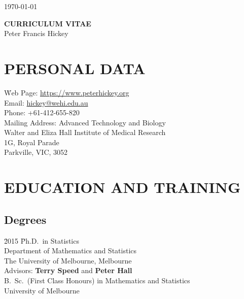 \documentclass[11pt,letterpaper,pdf]{article}
\begin{document}
\hfill \today

\begin{center}
{\bf \Large CURRICULUM VITAE}\\
\vspace*{5mm}
{\Large Peter Francis Hickey}
\end{center}


\section*{PERSONAL DATA}

\begin{tabbing}
  \= Web Page:\hspace*{2cm}
  \=\href{https://www.peterhickey.org}{https://www.peterhickey.org}\\
  \> Email: \>\href{mailto:hickey@wehi.edu.au}{hickey@wehi.edu.au}\\
  \> Phone: \>+61-412-655-820\\
  \> Mailing Address: \>Advanced Technology and Biology\\
  \> \> Walter and Eliza Hall Institute of Medical Research\\
  \> \>1G, Royal Parade\\
  \> \>Parkville, VIC, 3052\\
\end{tabbing}

\section*{EDUCATION AND TRAINING}

\subsection*{Degrees}

\begin{tabbing}
  \=2015 \hspace*{1.5cm} \=Ph.D.\ in Statistics\\
  \>\>Department of Mathematics and Statistics\\
  \>\>The University of Melbourne, Melbourne \\
  \>\>Advisors: \textbf{Terry Speed} and \textbf{Peter Hall}\\
    \>B.\ Sc.\ (First Class Honours) in Mathematics and Statistics \\
    \>\>University of Melbourne
\end{tabbing}
\end{document}
